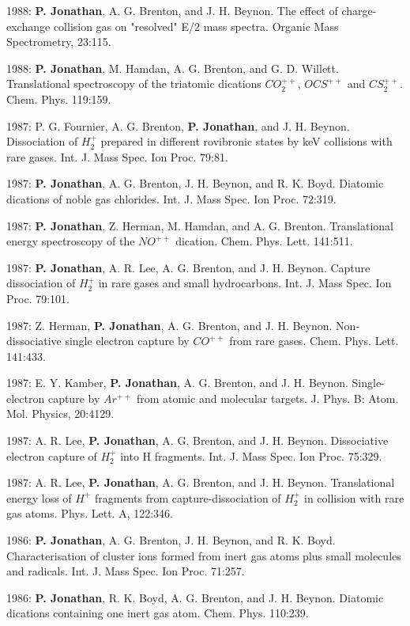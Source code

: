 \documentclass[11pt,a4paper]{moderncv}
\begin{document}
1988: \textbf{P. Jonathan}, A. G. Brenton, and J. H. Beynon. The effect of charge-exchange collision gas on "resolved" E/2 mass spectra. Organic Mass Spectrometry, 23:115.

1988: \textbf{P. Jonathan}, M. Hamdan, A. G. Brenton, and G. D. Willett. Translational spectroscopy of the triatomic dications $CO_2^{++}$, $OCS^{++}$ and $CS_2^{++}$. Chem. Phys. 119:159.

1987: P. G. Fournier, A. G. Brenton, \textbf{P. Jonathan}, and J. H. Beynon. Dissociation of $H_2^+$ prepared in different rovibronic states by keV collisions with rare gases. Int. J. Mass Spec. Ion Proc. 79:81.

1987: \textbf{P. Jonathan}, A. G. Brenton, J. H. Beynon, and R. K. Boyd. Diatomic dications of noble gas chlorides. Int. J. Mass Spec. Ion Proc. 72:319.

1987: \textbf{P. Jonathan}, Z. Herman, M. Hamdan, and A. G. Brenton. Translational energy spectroscopy of the $NO^{++}$ dication. Chem. Phys. Lett. 141:511.

1987: \textbf{P. Jonathan}, A. R. Lee, A. G. Brenton, and J. H. Beynon. Capture dissociation of $H_2^+$ in rare gases and small hydrocarbons. Int. J. Mass Spec. Ion Proc. 79:101.

1987: Z. Herman, \textbf{P. Jonathan}, A. G. Brenton, and J. H. Beynon. Non-dissociative single electron capture by $CO^{++}$ from rare gases. Chem. Phys. Lett. 141:433.

1987: E. Y. Kamber, \textbf{P. Jonathan}, A. G. Brenton, and J. H. Beynon. Single-electron capture by $Ar^{++}$ from atomic and molecular targets. J. Phys. B: Atom. Mol. Physics, 20:4129.

1987: A. R. Lee, \textbf{P. Jonathan}, A. G. Brenton, and J. H. Beynon. Dissociative electron capture of $H_2^+$ into H fragments. Int. J. Mass Spec. Ion Proc. 75:329.

1987: A. R. Lee, \textbf{P. Jonathan}, A. G. Brenton, and J. H. Beynon. Translational energy loss of $H^+$ fragments from capture-dissociation of $H_2^+$ in collision with rare gas atoms. Phys. Lett. A, 122:346.

1986: \textbf{P. Jonathan}, A. G. Brenton, J. H. Beynon, and R. K. Boyd. Characterisation of cluster ions formed from inert gas atoms plus small molecules and radicals. Int. J. Mass Spec. Ion Proc. 71:257.

1986: \textbf{P. Jonathan}, R. K. Boyd, A. G. Brenton, and J. H. Beynon. Diatomic dications containing one inert gas atom. Chem. Phys. 110:239.
\end{document}
